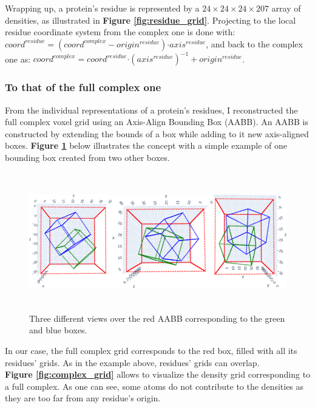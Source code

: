\documentclass{article}
\begin{document}
Wrapping up, a protein's residue is represented by a $24 \times 24 \times 24 \times 207$ array of densities, as illustrated in \textbf{Figure \ref{fig:residue_grid}}. Projecting to the local residue coordinate system from the complex one is done with: $coord^{residue} = (coord^{complex} - origin^{residue}) \boldsymbol{\cdot} axis^{residue}$, and back to the complex one as: $coord^{complex} = coord^{residue} \boldsymbol{\cdot} (axis^{residue})^{-1} + origin^{residue}$.

\subsubsection{To that of the full complex one}

From the individual representations of a protein's residues, I reconstructed the full complex voxel grid using an Axis-Align Bounding Box (AABB). An AABB is constructed by extending the bounds of a box while adding to it new axis-aligned boxes. \textbf{Figure \ref{fig:aabb}} below illustrates the concept with a simple example of one bounding box created from two other boxes.
\begin{figure}[H]
    \centering
    \includegraphics[height=6cm,width=\textwidth,keepaspectratio]{aabb.png}
    \caption{Three different views over the red AABB corresponding to the green and blue boxes.}
    \label{fig:aabb}
\end{figure}
In our case, the full complex grid corresponds to the red box, filled with all its residues' grids. As in the example above, residues' grids can overlap. \\
\textbf{Figure \ref{fig:complex_grid}} allows to visualize the density grid corresponding to a full complex. As one can see, some atoms do not contribute to the densities as they are too far from any residue's origin.
\end{document}
